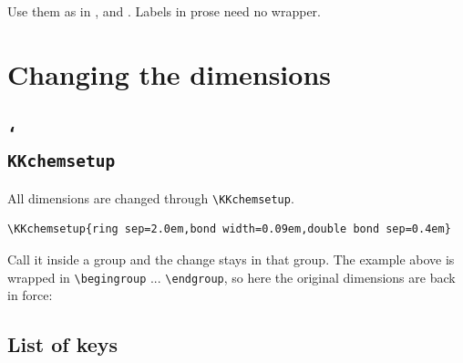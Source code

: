 \documentclass[paper=a4paper,fontsize=10pt]{jlreq}
\begin{document}
Use them as in ,  and . Labels in prose need
no wrapper.

\section{Changing the dimensions}

\subsection{\texttt{\char`\\KKchemsetup}}

All dimensions are changed through \verb|\KKchemsetup|.

\begin{verbatim}
\KKchemsetup{ring sep=2.0em,bond width=0.09em,double bond sep=0.4em}
\end{verbatim}

\begingroup
{}
\begin{center}
\KKsalicylicacid\qquad{}
\end{center}
\endgroup

Call it inside a group and the change stays in that group. The example above is
wrapped in \verb|\begingroup| ... \verb|\endgroup|, so here the original
dimensions are back in force: \KKsalicylicacid

\subsection{List of keys}
\end{document}
